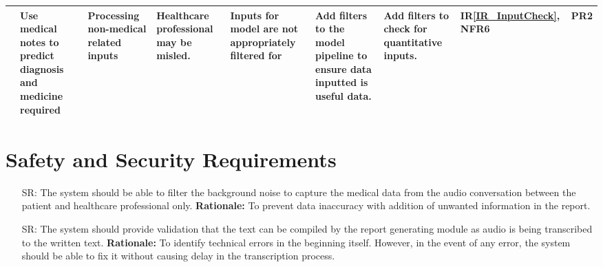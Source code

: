 \documentclass{article}
\newcounter{srnum} %
\begin{document}
\begin{landscape}
\begin{longtable}{|p{1.5cm}|p{2cm}|p{2.6cm}|p{2cm}|p{2cm}|p{2cm}|p{3.5cm}|p{1cm}|p{0.8cm}|}
        \midrule
        & \raggedright Use medical notes to predict diagnosis and medicine required & \raggedright Processing non-medical related inputs & \raggedright Healthcare professional may be misled. & \raggedright Inputs for model are not appropriately filtered for & \raggedright Add filters to the model pipeline to ensure data inputted is useful data. & \raggedright Add filters to check for quantitative inputs. & IR\ref{IR_InputCheck}, NFR6 & PR2 \\ 
        \bottomrule
    \end{longtable}
    
    
\end{landscape}

\section{Safety and Security Requirements}

\begin{itemize}
    \item [SR\refstepcounter{srnum}\thesrnum \label{SR_BackNoiseFilter}:] The system should be able to filter the background noise to capture the medical data from the audio conversation between the patient and healthcare professional only.
    \textbf{Rationale:} To prevent data inaccuracy with addition of unwanted information in the report.

    \item [SR\refstepcounter{srnum}\thesrnum \label{SR_CompilingVerification}:] The system should provide validation that the text can be compiled by the report generating module as audio is being transcribed to the written text.
    \textbf{Rationale:} To identify technical errors in the beginning itself. However, in the event of any error, the system should be able to fix it without causing delay in the transcription process. 

\end{itemize}
\end{document}
